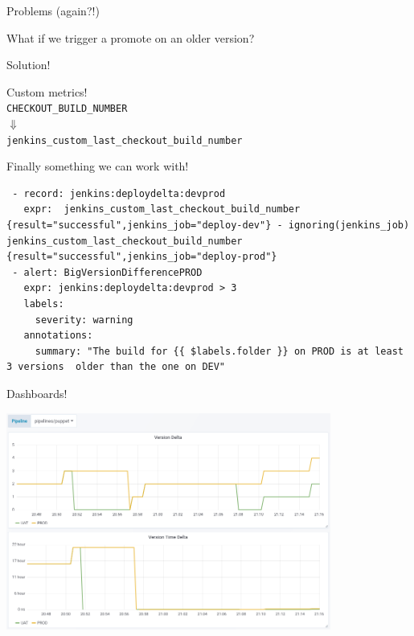 \documentclass[aspectratio=169,12pt]{beamer}
\begin{document}
\begin{frame}[fragile]{Problems (again?!)}
  \begin{center}
    \Large What if we trigger a promote on an older version?
  \end{center}
\end{frame}

\begin{frame}[fragile]{Solution!}
  \begin{center}
    \large Custom metrics! \normalsize \\
    \vspace{20pt}
    \verb|CHECKOUT_BUILD_NUMBER|\\
    $\Downarrow$ \\
    \verb|jenkins_custom_last_checkout_build_number|
  \end{center}
\end{frame}

\begin{frame}[fragile]{Finally something we can work with!}
  \begin{verbatim}
 - record: jenkins:deploydelta:devprod
   expr:  jenkins_custom_last_checkout_build_number {result="successful",jenkins_job="deploy-dev"} - ignoring(jenkins_job) jenkins_custom_last_checkout_build_number {result="successful",jenkins_job="deploy-prod"}
 - alert: BigVersionDifferencePROD
   expr: jenkins:deploydelta:devprod > 3
   labels:
     severity: warning
   annotations:
     summary: "The build for {{ $labels.folder }} on PROD is at least 3 versions  older than the one on DEV"
  \end{verbatim}
\end{frame}

\begin{frame}{Dashboards!}
  \begin{center}
    \includegraphics[width=0.8\textwidth]{img/graphs.png}
  \end{center}
\end{frame}
\end{document}
